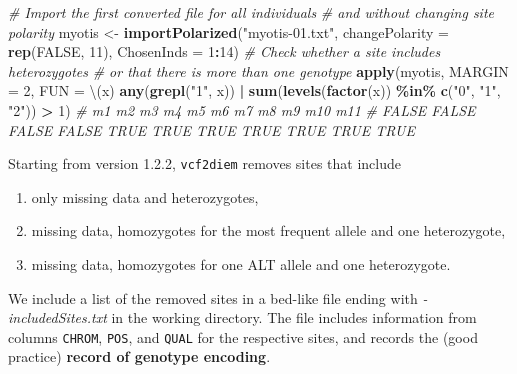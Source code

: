 \documentclass[
]{book}
\newenvironment{Shaded}{\begin{snugshade}}{\end{snugshade}}
\newcommand{\AttributeTok}[1]{\textcolor[rgb]{0.13,0.29,0.53}{#1}}
\newcommand{\CommentTok}[1]{\textcolor[rgb]{0.56,0.35,0.01}{\textit{#1}}}
\newcommand{\ConstantTok}[1]{\textcolor[rgb]{0.56,0.35,0.01}{#1}}
\newcommand{\DecValTok}[1]{\textcolor[rgb]{0.00,0.00,0.81}{#1}}
\newcommand{\FunctionTok}[1]{\textcolor[rgb]{0.13,0.29,0.53}{\textbf{#1}}}
\newcommand{\NormalTok}[1]{#1}
\newcommand{\OtherTok}[1]{\textcolor[rgb]{0.56,0.35,0.01}{#1}}
\newcommand{\SpecialCharTok}[1]{\textcolor[rgb]{0.81,0.36,0.00}{\textbf{#1}}}
\newcommand{\StringTok}[1]{\textcolor[rgb]{0.31,0.60,0.02}{#1}}
\providecommand{\tightlist}{%
  \setlength{\itemsep}{0pt}\setlength{\parskip}{0pt}}
\begin{document}
\begin{Shaded}
\begin{Highlighting}[]
\CommentTok{\# Import the first converted file for all individuals }
\CommentTok{\# and without changing site polarity}
\NormalTok{myotis }\OtherTok{\textless{}{-}} \FunctionTok{importPolarized}\NormalTok{(}\StringTok{"myotis{-}01.txt"}\NormalTok{, }
                          \AttributeTok{changePolarity =} \FunctionTok{rep}\NormalTok{(}\ConstantTok{FALSE}\NormalTok{, }\DecValTok{11}\NormalTok{), }
                          \AttributeTok{ChosenInds =} \DecValTok{1}\SpecialCharTok{:}\DecValTok{14}\NormalTok{)}
\CommentTok{\# Check whether a site includes heterozygotes }
\CommentTok{\# or that there is more than one genotype}
\FunctionTok{apply}\NormalTok{(myotis, }\AttributeTok{MARGIN =} \DecValTok{2}\NormalTok{, }
      \AttributeTok{FUN =}\NormalTok{ \textbackslash{}(x) }\FunctionTok{any}\NormalTok{(}\FunctionTok{grepl}\NormalTok{(}\StringTok{"1"}\NormalTok{, x)) }\SpecialCharTok{|} \FunctionTok{sum}\NormalTok{(}\FunctionTok{levels}\NormalTok{(}\FunctionTok{factor}\NormalTok{(x)) }\SpecialCharTok{\%in\%} \FunctionTok{c}\NormalTok{(}\StringTok{"0"}\NormalTok{, }\StringTok{"1"}\NormalTok{, }\StringTok{"2"}\NormalTok{)) }\SpecialCharTok{\textgreater{}} \DecValTok{1}\NormalTok{) }
\CommentTok{\#    m1    m2    m3    m4    m5    m6    m7    m8    m9   m10   m11 }
\CommentTok{\# FALSE FALSE FALSE FALSE  TRUE  TRUE  TRUE  TRUE  TRUE  TRUE  TRUE }
\end{Highlighting}
\end{Shaded}

Starting from version 1.2.2, \texttt{vcf2diem} removes sites that include

\begin{enumerate}
\def\labelenumi{\arabic{enumi}.}
\tightlist
\item
  only missing data and heterozygotes,
\item
  missing data, homozygotes for the most frequent allele and one heterozygote,
\item
  missing data, homozygotes for one ALT allele and one heterozygote.
\end{enumerate}

We include a list of the removed sites in a bed-like file ending with \emph{-includedSites.txt} in the working directory. The file includes information from columns \texttt{CHROM}, \texttt{POS}, and \texttt{QUAL} for the respective sites, and records the (good practice) \textbf{record of genotype encoding}.
\end{document}
